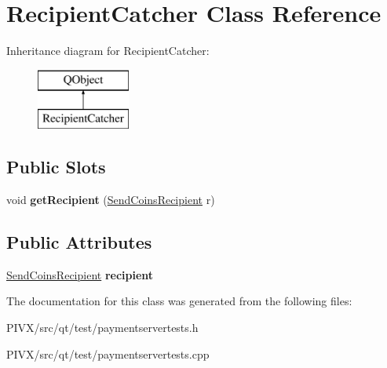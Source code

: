 \hypertarget{class_recipient_catcher}{}\section{Recipient\+Catcher Class Reference}
\label{class_recipient_catcher}
Inheritance diagram for Recipient\+Catcher\+:\begin{figure}[H]
\begin{center}
\leavevmode
\includegraphics[height=2.000000cm]{class_recipient_catcher}
\end{center}
\end{figure}
\subsection*{Public Slots}
\begin{DoxyCompactItemize}
\item 
\mbox{\label{class_recipient_catcher_a8358593057a05ad8d4b0530040f79301}} 
void {\bfseries get\+Recipient} (\mbox{\hyperlink{class_send_coins_recipient}{Send\+Coins\+Recipient}} r)
\end{DoxyCompactItemize}
\subsection*{Public Attributes}
\begin{DoxyCompactItemize}
\item 
\mbox{\label{class_recipient_catcher_a5645bda3783d7bf06781b0003faa4446}} 
\mbox{\hyperlink{class_send_coins_recipient}{Send\+Coins\+Recipient}} {\bfseries recipient}
\end{DoxyCompactItemize}


The documentation for this class was generated from the following files\+:\begin{DoxyCompactItemize}
\item 
P\+I\+V\+X/src/qt/test/paymentservertests.\+h\item 
P\+I\+V\+X/src/qt/test/paymentservertests.\+cpp\end{DoxyCompactItemize}
